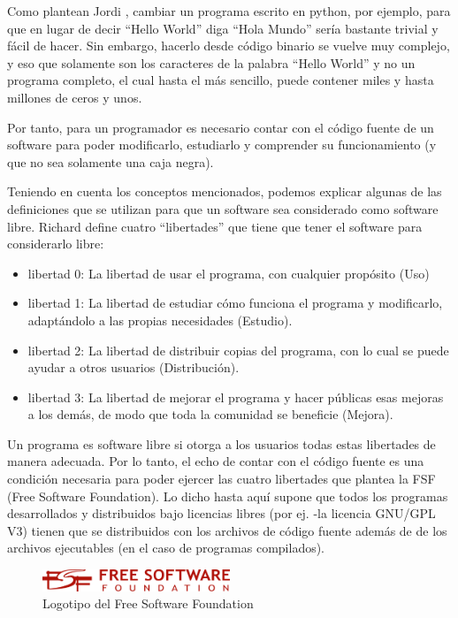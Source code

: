   
  
Como plantean Jordi \cite{adell_software_2007}, cambiar un programa escrito en python, por ejemplo, para que en lugar de decir “Hello World” diga “Hola Mundo” sería bastante trivial y fácil de hacer. Sin embargo, hacerlo desde código binario se vuelve muy complejo, y eso que solamente son los caracteres de la palabra “Hello World” y no un programa completo, el cual hasta el más sencillo, puede contener miles y hasta  millones de ceros y unos.

 Por tanto, para un programador es necesario contar con el código fuente de un software para poder modificarlo, estudiarlo y comprender su funcionamiento (y que no sea solamente una caja negra).
 
Teniendo en cuenta los conceptos mencionados, podemos explicar algunas de las definiciones que se utilizan para que un software sea considerado como software libre. Richard \cite{stallman_software_2007} define cuatro “libertades” que tiene que tener el software para considerarlo libre:

\begin{itemize}
   \item libertad 0: La libertad de usar el programa, con cualquier propósito (Uso)
   \item libertad 1: La libertad de estudiar cómo funciona el programa y modificarlo, adaptándolo a las propias necesidades (Estudio).
   \item libertad 2: La libertad de distribuir copias del programa, con lo cual se puede ayudar a otros usuarios (Distribución).
   \item libertad 3: La libertad de mejorar el programa y hacer públicas esas mejoras a los demás, de modo que toda la comunidad se beneficie (Mejora).
 \end{itemize} 
 
Un programa es software libre si otorga a los usuarios todas estas libertades de manera adecuada. Por lo tanto, el echo de contar con el código fuente es una condición necesaria para poder ejercer las cuatro libertades que plantea la FSF (Free Software Foundation). Lo dicho hasta aquí supone que todos los programas desarrollados y distribuidos bajo licencias libres (por ej. -la licencia GNU/GPL V3) tienen que se distribuidos con los archivos de código fuente además de de los archivos ejecutables (en el caso de programas compilados).

\begin{figure}
  \begin{center}
    \includegraphics[width=0.5\textwidth]{figuras/fsf.png}
    \caption{Logotipo del Free Software Foundation}
    \label{fig: }
  \end{center}
\end{figure}

